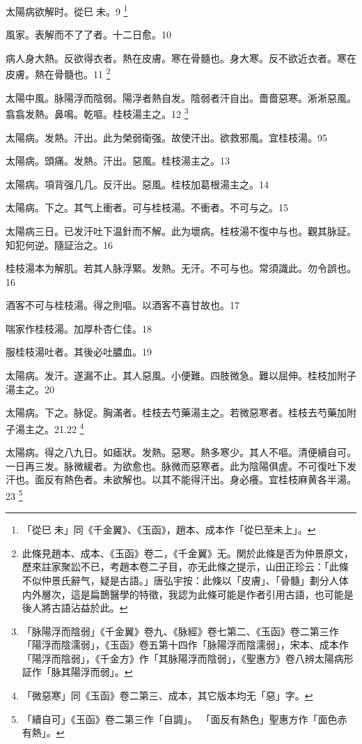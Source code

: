 太陽病欲解时。從巳{\sungtpii 𥁞}未。9
	\footnote{
		「從巳{\sungtpii 𥁞}未」同《千金翼》、《玉函》，趙本、成本作「從巳至未上」。
	}

風家。表解而不了了者。十二日愈。10

病人身大熱。反欲得衣者。熱在皮膚。寒在骨髓也。身大寒。反不欲近衣者。寒在皮膚。熱在骨髓也。11
	\footnote{
		此條見趙本、成本、《玉函》卷二，《千金翼》无。関於此條是否为仲景原文，歷來註家聚訟不已，考趙本卷二子目，亦无此條之提示，山田正珍云：「此條不似仲景氏辭气，疑是古語。」唐弘宇按：此條以「皮膚」、「骨髓」劃分人体内外層次，這是扁鵲醫學的特徵，我認为此條可能是作者引用古語，也可能是後人將古語沾益於此。
	}

太陽中風。{\khaaitp 脉}陽浮而陰弱。陽浮者熱自发。陰弱者汗自出。嗇嗇惡寒。淅淅惡風。翕翕发熱。鼻鳴。乾嘔。桂枝湯主之。12
	\footnote{
		「脉陽浮而陰弱」《千金翼》卷九、《脉經》卷七第二、《玉函》卷二第三作「陽浮而陰濡弱」，《玉函》卷五第十四作「脉陽浮而陰濡弱」，宋本、成本作「陽浮而陰弱」，《千金方》作「其脉陽浮而陰弱」，《聖惠方》卷八辨太陽病形証作「脉其陽浮而弱」。
	}

太陽病。发熱。汗出。此为榮弱衛强。故使汗出。欲救邪風。宜桂枝湯。95

太陽病。頭痛。发熱。汗出。惡風。桂枝湯主之。13

太陽病。項背强几几。反汗出。惡風。桂枝{\khaaitp 加葛根}湯主之。14

太陽病。下之。其气上衝者。可与桂枝湯。不衝者。不可与之。15

太陽病三日。已发汗吐下温針而不解。此为壞病。桂枝湯不復中与也。觀其脉証。知犯何逆。隨証治之。16

桂枝湯本为解肌。若其人脉浮緊。发熱。无汗。不可与也。常須識此。勿令誤也。16

酒客不可与桂枝湯。得之則嘔。以酒客不喜甘故也。17

喘家作桂枝湯。加厚朴杏仁佳。18

服桂枝湯吐者。其後必吐膿血。19

太陽病。发汗。遂漏不止。其人惡風。小便難。四肢微急。難以屈伸。桂枝加附子湯主之。20

太陽病。下之。脉促。胸滿者。桂枝去芍藥湯主之。若微{\khaaitp 惡}寒者。桂枝去芍藥加附子湯主之。21.22
	\footnote{
		「微惡寒」同《玉函》卷二第三、成本，其它版本均无「惡」字。
	}

太陽病。得之八九日。如瘧狀。发熱。惡寒。熱多寒少。其人不嘔。清便續自可。一日再三发。脉微緩者。为欲愈也。脉微而惡寒者。此为陰陽俱虗。不可復{\khaaitp 吐下}发汗也。面反有熱色者。未欲解也。以其不能得汗出。身必癢。宜桂枝麻黄各半湯。23
	\footnote{
		「續自可」《玉函》卷二第三作「自調」。
		「面反有熱色」聖惠方作「面色赤有熱」。
	}


